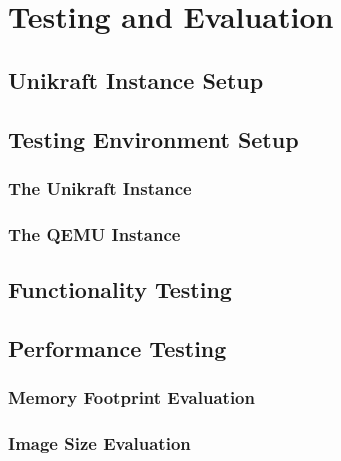 \chapter{Testing and Evaluation}
\label{chapter:testing-evaluation}

\section{Unikraft Instance Setup}
\label{sec:unikraft-instance-setup}

\section{Testing Environment Setup}
\label{sec:testing-environment-setup}

\subsection{The Unikraft Instance}
\label{subsec:testing-environment-setup}

\subsection{The QEMU Instance}
\label{subsec:qemu-instance}

\section{Functionality Testing}
\label{sec:functionality-testing}

\section{Performance Testing}
\label{sec:performance-testing}

\subsection{Memory Footprint Evaluation}
\label{subsec:memory-footprint-evaluation}

\subsection{Image Size Evaluation}
\label{subsec:image-size-evaluation}

